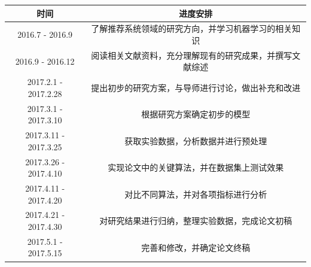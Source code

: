 \begin{table}[h]
\centering
\label{my-label}
\begin{tabular}{cc}
\hline
\rowcolor[HTML]{EFEFEF} 
\textbf{时间}           & \textbf{进度安排}                \\ \hline
2016.7 - 2016.9       & 了解推荐系统领域的研究方向，并学习机器学习的相关知识   \\ \hline
2016.9 - 2016.12      & 阅读相关文献资料，充分理解现有的研究成果，并撰写文献综述 \\ \hline
2017.2.1 - 2017.2.28  & 提出初步的研究方案，与导师进行讨论，做出补充和改进    \\ \hline
2017.3.1 - 2017.3.10  & 根据研究方案确定初步的模型                \\ \hline
2017.3.11 - 2017.3.25 & 获取实验数据，分析数据并进行预处理            \\ \hline
2017.3.26 - 2017.4.10 & 实现论文中的关键算法，并在数据集上测试效果        \\ \hline
2017.4.11 - 2017.4.20 & 对比不同算法，并对各项指标进行分析            \\ \hline
2017.4.21 - 2017.4.30 & 对研究结果进行归纳，整理实验数据，完成论文初稿      \\ \hline
2017.5.1 - 2017.5.15  & 完善和修改，并确定论文终稿                \\ \hline
\end{tabular}
\end{table}










